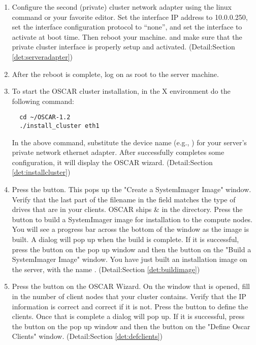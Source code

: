 \begin {enumerate}
\item Configure the second (private) cluster network adapter using the linux
 command or your favorite editor. Set the interface 
IP address to 10.0.0.250, set the interface configuration protocol
to ``none'', and set the interface to activate at boot time.
Then reboot your machine. and make sure that the private cluster
interface is properly setup and activated. 
(Detail:Section \ref{det:serveradapter})

\item After the reboot is complete, log on as root to the server 
machine.

\item To start the OSCAR cluster installation,  in the X environment do
the following command:

\begin{verbatim}
  cd ~/OSCAR-1.2
  ./install_cluster eth1
\end{verbatim}
  
In the above command, substitute the device name 
(e.g., )
for your server's private network ethernet adapter. After 
successfully completes some configuration, it will display 
the OSCAR wizard.
(Detail:Section \ref{det:installcluster})

\item Press the  button. 
This pops up the "Create a SystemImager Image" window. Verify that the last
part of the filename in the  field matches
the type of drives that are in your clients. OSCAR ships 
\&  in the  directory.
Press the  button to build a SystemImager image for installation to
the compute nodes.  You will see a progress bar across the bottom
of the window as the image is built.  A dialog will pop up when the build is complete. 
If it is successful, press the  button on the pop up window 
and then the  button on the "Build a SystemImager
Image" window. You have just built an installation image on the
server, with the name .
(Detail:Section \ref{det:buildimage})

\item Press the  button on the OSCAR Wizard. 
On the window that is opened, fill in the number of client nodes that your cluster
contains. Verify that the IP information is correct and correct if it is not.
Press the  button to define the clients. Once that is 
complete a dialog will pop up. 
If it is successful, press the  button on the pop up window 
and then the  button on the "Define Oscar Clients"
window. 
(Detail:Section \ref{det:defclients})


\end{enumerate}
